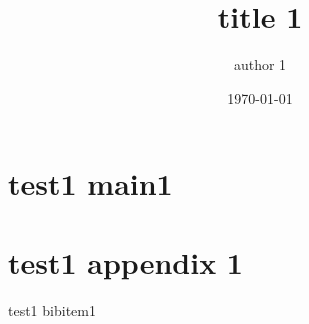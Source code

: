 \documentclass[]{jsarticle}
\title{title 1}
\author{author 1}
\date{\today}
\begin{document}
\maketitle
\section{test1 main1}
\appendix
\section{test1 appendix 1}
\begin{thebibliography}{1}
     test1 bibitem1
\end{thebibliography}
\end{document}
